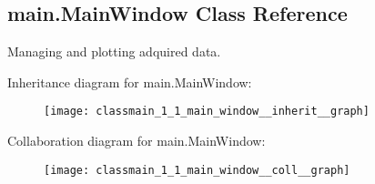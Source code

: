 \hypertarget{classmain_1_1_main_window}{\subsection{main.\-Main\-Window Class Reference}
\label{classmain_1_1_main_window}
}


Managing and plotting adquired data.  




Inheritance diagram for main.\-Main\-Window\-:\nopagebreak
\begin{figure}[H]
\begin{center}
\leavevmode
\texttt{[image: classmain\_1\_1\_main\_window\_\_inherit\_\_graph]}
\end{center}
\end{figure}


Collaboration diagram for main.\-Main\-Window\-:\nopagebreak
\begin{figure}[H]
\begin{center}
\leavevmode
\texttt{[image: classmain\_1\_1\_main\_window\_\_coll\_\_graph]}
\end{center}
\end{figure}
